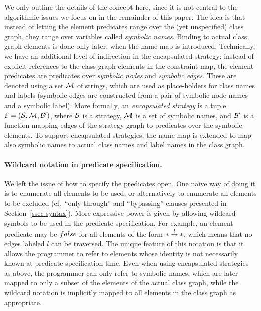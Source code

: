 We only outline the details of the concept here, since it is not
central to the algorithmic issues we focus on in the remainder of this
paper.  The idea is that instead of letting the element predicates
range over the (yet unspecified) class graph, they range over
variables called {\em symbolic names}.  Binding to actual class graph
elements is done only later, when the name map is introduced.
Technically, we have an additional level of indirection in the
encapsulated strategy: instead of explicit references to the class
graph elements in the constraint map, the element predicates are
predicates over {\em symbolic nodes} and {\em symbolic edges.}  These
are denoted using a set ${\cal M}$ of strings, which are used as
place-holders for class names and labels (symbolic edges are
constructed from a pair of symbolic node names and a symbolic label).
More formally, an {\em encapsulated strategy} is a tuple
${\cal E}=({\cal S},{\cal M},{\cal B}')$, where ${\cal S}$ is a strategy, ${\cal M}$ is a set of
symbolic names, and ${\cal B}'$ is a function mapping edges of the strategy
graph to predicates over the symbolic elements.  To support
encapsulated strategies, the name map is extended to map also symbolic
names to actual class names and label names in the class graph.

\paragraph{Wildcard notation in predicate specification.}
We left the issue of how to specify the predicates open. One naive way
of doing it is to enumerate all elements to be used, or alternatively
to enumerate all elements to be excluded (cf.\ ``only-through'' and
``bypassing'' clauses presented in Section~\ref{ssec-syntax}).  More
expressive power is given by allowing wildcard symbols to be used in
the predicate specification. For example, an element predicate may be
${\sc false}$ for all elements of the form $*\stackrel{l}{\rightarrow}*$, which means that
no edges labeled $l$ can be traversed.  The unique feature of this
notation is that it allows the programmer to refer to elements whose
identity is not necessarily known at predicate-specification
time. Even when using encapsulated strategies as above, the programmer
can only refer to symbolic names, which are later mapped to only a
subset of the elements of the actual class graph, while the wildcard
notation is implicitly mapped to all elements in the class graph as
appropriate.

